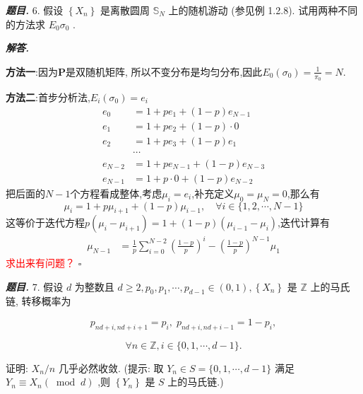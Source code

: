\documentclass[10pt, a4paper, oneside]{ctexart}
\newenvironment{problem}{\begin{framed}\par\noindent\textbf{\textit{题目. }}}{\end{framed}\par}
\newenvironment{solution}{%
  \par\noindent\textbf{\textit{解答. }}\ignorespaces
}{%
  \hfill\ensuremath{\square}\par %
}
\begin{document}
\begin{problem}
    6. 假设 \( \left\{  {X}_{n}\right\}   \) 是离散圆周 \( {\mathbb{S}}_{N} \) 上的随机游动 (参见例 1.2.8). 试用两种不同的方法求 \( {E}_{0}{\sigma }_{0} \) .
\end{problem}

\begin{solution}
    \textbf{方法一}:因为$\mathbf{P}$是双随机矩阵, 所以不变分布是均匀分布,因此$E_0(\sigma_0)=\frac{1}{\pi_0}=N$.

    \textbf{方法二}:首步分析法,$E_i(\sigma_0)=e_i$
    \begin{align*}
        e_0&=1+pe_1+(1-p)e_{N-1}\\
        e_1&=1+pe_2+(1-p)\cdot 0\\
        e_2&=1+pe_3+(1-p)e_{1}\\
        &\cdots \\
        e_{N-2}&=1+pe_{N-1}+(1-p)e_{N-3}\\
        e_{N-1}&=1+p\cdot 0+(1-p)e_{N-2}
    \end{align*}
    把后面的$N-1$个方程看成整体,考虑$\mu_i=e_i$,补充定义$\mu_0=\mu_N=0$,那么有
    $$\mu_i=1+p\mu_{i+1}+(1-p)\mu_{i-1},\quad \forall i\in \{1,2,\cdots,N-1\}$$
    这等价于迭代方程$p(\mu_i-\mu_{i+1})=1+(1-p)(\mu_{i-1}-\mu_i)$,迭代计算有
    \begin{align*}
        \mu_{N-1}&=\frac{1}{p}\sum_{i=0}^{N-2}(\frac{1-p}{p})^{i}-(\frac{1-p}{p})^{N-1}\mu_1
    \end{align*}
    \textcolor{red}{求出来有问题？}
\end{solution}

\begin{problem}
    7. 假设 \( d \) 为整数且 \( d \geq  2,{p}_{0},{p}_{1},\cdots ,{p}_{d - 1} \in  \left( {0,1}\right) ,\left\{  {X}_{n}\right\}   \) 是 \( \mathbb{Z} \) 上的马氏链, 转移概率为

\[{p}_{{nd} + i,{nd} + i + 1} = {p}_{i},\;{p}_{{nd} + i,{nd} + i - 1} = 1 - {p}_{i},\]

\[\forall n \in  \mathbb{Z},i \in  \{ 0,1,\cdots ,d - 1\} .\]

证明: \( {X}_{n}/n \) 几乎必然收敛. (提示: 取 \( {Y}_{n} \in  S = \{ 0,1,\cdots ,d - 1\}  \) 满足 \( {Y}_{n} \equiv  {X}_{n}\left( {\;\operatorname{mod}\;d}\right)  \) ,则 \( \left\{  {Y}_{n}\right\}   \) 是 \( S \) 上的马氏链.)
\end{problem}
\end{document}
